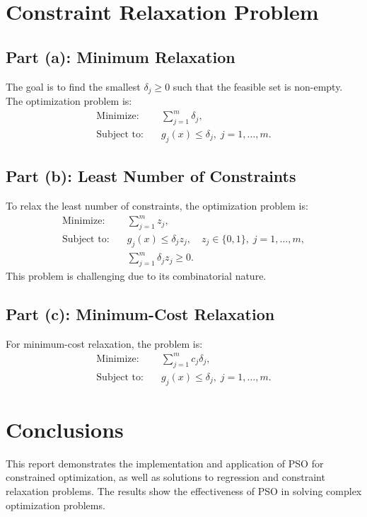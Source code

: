 \documentclass[12pt]{article}
\begin{document}
\section{Constraint Relaxation Problem}

\subsection{Part (a): Minimum Relaxation}
The goal is to find the smallest $\delta_j \geq 0$ such that the feasible set is non-empty. The optimization problem is:
\begin{align*}
    \text{Minimize:} & \quad \sum_{j=1}^{m} \delta_j, \\
    \text{Subject to:} & \quad g_j(x) \leq \delta_j, \; j = 1, \dots, m.
\end{align*}

\subsection{Part (b): Least Number of Constraints}
To relax the least number of constraints, the optimization problem is:
\begin{align*}
    \text{Minimize:} & \quad \sum_{j=1}^{m} z_j, \\
    \text{Subject to:} & \quad g_j(x) \leq \delta_j z_j, \quad z_j \in \{0, 1\}, \; j = 1, \dots, m, \\
                 & \quad \sum_{j=1}^{m} \delta_j z_j \geq 0.
\end{align*}
This problem is challenging due to its combinatorial nature.

\subsection{Part (c): Minimum-Cost Relaxation}
For minimum-cost relaxation, the problem is:
\begin{align*}
    \text{Minimize:} & \quad \sum_{j=1}^{m} c_j \delta_j, \\
    \text{Subject to:} & \quad g_j(x) \leq \delta_j, \; j = 1, \dots, m.
\end{align*}

\section{Conclusions}
This report demonstrates the implementation and application of PSO for constrained optimization, as well as solutions to regression and constraint relaxation problems. The results show the effectiveness of PSO in solving complex optimization problems.
\end{document}
